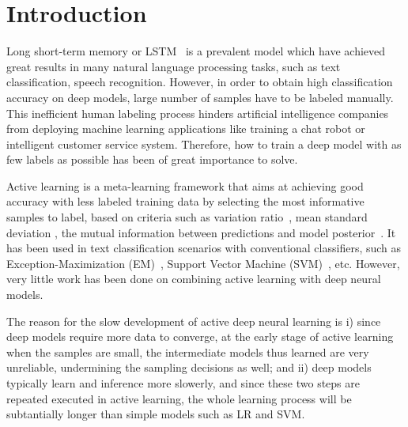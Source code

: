 \section{Introduction}
\label{sec:intro}
     Long short-term memory or LSTM~\cite{hochreiter1997long} is 
a prevalent model which have achieved great results in many 
natural language processing tasks, such as text classification, speech recognition. However, in order to obtain high classification accuracy on deep models, large number of samples have to be labeled manually. This inefficient human labeling process hinders artificial intelligence companies from deploying machine learning applications like training a chat robot or intelligent customer service system. Therefore, how to train a deep model with as few labels as possible has been of great importance to solve.
     
Active learning is a meta-learning framework that aims at
achieving good accuracy with less labeled training data by selecting 
the most informative samples to label, based on criteria
such as variation ratio~\cite{freeman1965elementary}, 
mean standard deviation \cite{kampffmeyer2016semantic}, the 
mutual information between predictions and model 
posterior~\cite{houlsby2011bayesian}.
It has been used in text classification scenarios with 
conventional classifiers, such as 
Exception-Maximization (EM)~\cite{mccallumzy1998employing}, 
Support Vector Machine (SVM)~\cite{tong2001support}, etc.
However, very little work has been done on combining active learning 
with deep neural models. 
     
The reason for the slow development of active deep neural learning
is i) since deep models require more data to converge, at the early
stage of active learning when the samples are small, the intermediate
models thus learned are very unreliable, 
undermining the sampling decisions as well; and ii) 
deep models typically learn and inference more slowerly, and since these 
two steps are repeated executed in active learning, the whole learning
process will be subtantially longer than simple models such as LR and SVM.

% 

